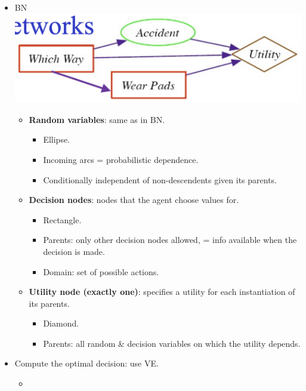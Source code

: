 \documentclass{article}
\begin{document}
\begin{itemize}
    \item BN\\
        \includegraphics[scale=0.5]{decisions_network_bn.png}
        \begin{itemize}
            \item \textbf{Random variables}: same as in BN.
                \begin{itemize}
                    \item Ellipse.
                    \item Incoming arcs = probabilistic dependence.
                    \item Conditionally independent of non-descendents given its parents.
                \end{itemize}
            \item \textbf{Decision nodes}: nodes that the agent choose values for.
                \begin{itemize}
                    \item Rectangle.
                    \item Parents: only other decision nodes allowed, = info available when the decision is made.
                    \item Domain: set of possible actions.
                \end{itemize}
            \item \textbf{Utility node (exactly one)}: specifies a utility for each instantiation of its parents.
                \begin{itemize}
                    \item Diamond.
                    \item Parents: all random \& decision variables on which the utility depends.
                \end{itemize}
        \end{itemize}
    \item Compute the optimal decision: use VE.
        \begin{itemize}
            \item

\end{itemize}
\end{itemize}
\end{document}
